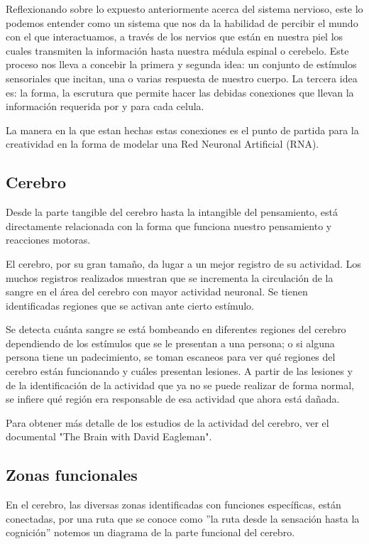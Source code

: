 Reflexionando sobre lo expuesto anteriormente acerca del sistema nervioso,
este lo podemos entender como un sistema que nos da la habilidad de percibir el mundo con el que interactuamos, a través de los nervios que están en nuestra piel los cuales transmiten la información hasta nuestra médula espinal o cerebelo. Este proceso nos lleva a concebir la primera y segunda idea: un conjunto de estímulos sensoriales que incitan, una o varias respuesta de nuestro cuerpo. La tercera idea es: la forma, la escrutura que permite hacer las debidas conexiones que llevan la información requerida por y para cada celula.

La manera en la que estan hechas estas conexiones es el punto de partida para la creatividad en la forma de modelar una Red Neuronal Artificial (RNA).

\subsection{Cerebro}

Desde la parte tangible del cerebro hasta la intangible del pensamiento, está directamente relacionada con la forma que funciona nuestro pensamiento y reacciones motoras.


El cerebro, por su gran tamaño, da lugar a un mejor registro de su actividad. Los muchos registros realizados muestran que se incrementa la circulación de la sangre en el área del cerebro con mayor actividad neuronal. Se tienen identificadas regiones que se activan ante cierto estímulo. \cite{neurona_A_cerebro}


 Se detecta cuánta sangre se está bombeando en diferentes regiones del cerebro dependiendo de los estímulos que se le presentan a una persona; o si alguna persona tiene un padecimiento, se toman escaneos para ver qué regiones del cerebro están funcionando y cuáles presentan lesiones. A partir de las lesiones y de la identificación de la actividad que ya no se puede realizar de forma normal, se infiere qué región era responsable de esa actividad que ahora está dañada.\cite{estudiosF}

Para obtener más detalle de los estudios de la actividad del cerebro, ver el documental "The Brain with David Eagleman".

\subsection{Zonas funcionales}

En el cerebro, las diversas zonas identificadas con funciones específicas, están conectadas, por una ruta que se conoce como 
 ''la ruta desde la sensación hasta la cognición'' notemos un diagrama de la parte funcional del cerebro. \cite{sensAcogn}  



